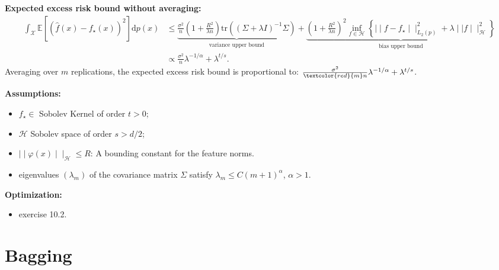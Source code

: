 \documentclass[
11pt,notheorems,hyperref={pdfauthor=whatever}
]{beamer}
\begin{document}
\begin{frame}
    \textbf{Expected excess risk bound without averaging:}
    \[
        \begin{aligned}
            \int_{\mathcal{X}}\mathbb{E}\left[(\hat{f}(x)-f_\star(x))^2\right]\mathrm{d}p(x) &\leq \underbrace{\frac{\sigma^2}{n}\left(1+\frac{R^2}{\lambda n}\right)\text{tr}\left(\left(\Sigma+\lambda I\right)^{-1}\Sigma\right)}_{\text{variance upper bound}} + \underbrace{\left(1+\frac{R^2}{\lambda n}\right)^2\inf\limits_{f\in\mathcal{H}}\left\{\mid\mid f-f_\star\mid\mid^2_{L_2(p)}+\lambda\mid\mid f\mid\mid_{\mathcal{H}}^2\right\}}_{\text{bias upper bound}}\\
            & \propto \frac{\sigma^2}{n}\lambda^{-1/\alpha}+\lambda^{t/s}.
        \end{aligned}
    \]
    Averaging over \(m\) replications, the expected excess risk bound is proportional to: \(\frac{\sigma^2}{\textcolor{red}{m}n}\lambda^{-1/\alpha}+\lambda^{t/s}\).
    
    \vspace{0.25em}
    \textbf{Assumptions:}
    \begin{itemize}
        \item \(f_\star\in\) Sobolev Kernel of order \(t>0\);
        \item \(\mathcal{H}\) Sobolev space of order \(s>d/2\);
        \item \(\mid\mid\varphi(x)\mid\mid_\mathcal{H}\leq R\): A bounding constant for the feature norms.
        \item eigenvalues \((\lambda_m)\) of the covariance matrix \(\Sigma\) satisfy \(\lambda_m\leq C(m+1)^{\alpha}\), \(\alpha>1\).
    \end{itemize}  

    \vspace{0.5em}
    \textbf{Optimization:}
    \begin{itemize}
        \item exercise 10.2.
    \end{itemize}
\end{frame}


\section{Bagging}
\end{document}

